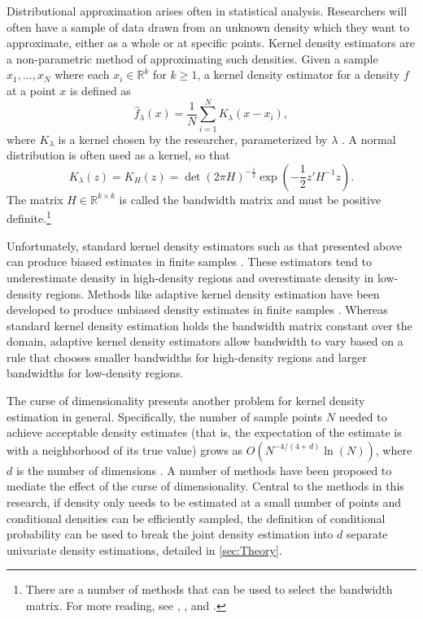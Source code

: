 \documentclass[twocolumn]{article}
\newcommand{\RR}{\mathbb{R}}
\begin{document}

Distributional approximation arises often in statistical analysis. Researchers will often have a sample of data drawn from an unknown density which they want to approximate, either as a whole or at specific points. Kernel density estimators are a non-parametric method of approximating such densities. Given a sample $x_1, ..., x_N$ where each $x_i\in\RR^k$ for $k\geq1$, a kernel density estimator for a density $f$ at a point $x$ is defined as
\begin{equation}
	\hat{f}_\lambda(x) = \frac{1}{N}\sum_{i=1}^N K_\lambda(x - x_i),
\end{equation}
where $K_\lambda$ is a kernel chosen by the researcher, parameterized by $\lambda$ \citep{SilvermanDE}. A normal distribution is often used as a kernel, so that
\begin{equation}
	K_\lambda(z) = K_H(z) = \det(2\pi H)^{-\frac12} \exp\left(-\frac12 z' H^{-1} z\right).
\end{equation}
The matrix $H\in\RR^{k\times k}$ is called the bandwidth matrix and must be positive definite.\footnote{There are a number of methods that can be used to select the bandwidth matrix. For more reading, see \cite{SilvermanDE}, \cite{Scott}, and \cite{SheatherJones}.}

Unfortunately, standard kernel density estimators such as that presented above can produce biased estimates in finite samples \citep{SilvermanDE}. These estimators tend to underestimate density in high-density regions and overestimate density in low-density regions. Methods like adaptive kernel density estimation have been developed to produce unbiased density estimates in finite samples \citep{Portnoy}. Whereas standard kernel density estimation holds the bandwidth matrix constant over the domain, adaptive kernel density estimators allow bandwidth to vary based on a rule that chooses smaller bandwidths for high-density regions and larger bandwidths for low-density regions.

The curse of dimensionality presents another problem for kernel density estimation in general. Specifically, the number of sample points $N$ needed to achieve acceptable density estimates (that is, the expectation of the estimate is with a neighborhood of its true value) grows as $O\left(N^{-4/(4+d)}\ln(N)\right)$, where $d$ is the number of dimensions \citep{LiuLafferty}. A number of methods have been proposed to mediate the effect of the curse of dimensionality. Central to the methods in this research, if density only needs to be estimated at a small number of points and conditional densities can be efficiently sampled, the definition of conditional probability can be used to break the joint density estimation into $d$ separate univariate density estimations, detailed in \cref{sec:Theory}.
\end{document}
